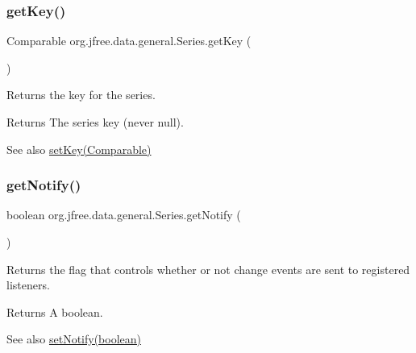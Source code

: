 \subsubsection{\texorpdfstring{get\+Key()}{getKey()}}
{\footnotesize\ttfamily Comparable org.\+jfree.\+data.\+general.\+Series.\+get\+Key (\begin{DoxyParamCaption}{ }\end{DoxyParamCaption})}

Returns the key for the series.

\begin{DoxyReturn}{Returns}
The series key (never {\ttfamily null}).
\end{DoxyReturn}
\begin{DoxySeeAlso}{See also}
\mbox{\hyperlink{classorg_1_1jfree_1_1data_1_1general_1_1_series_a9d5a4915a30d62fc59dbfc351efdf24e}{set\+Key(\+Comparable)}} 
\end{DoxySeeAlso}
\mbox{\label{classorg_1_1jfree_1_1data_1_1general_1_1_series_a9a5482d882214bd5a1be9690b77fbd39}} 
\subsubsection{\texorpdfstring{get\+Notify()}{getNotify()}}
{\footnotesize\ttfamily boolean org.\+jfree.\+data.\+general.\+Series.\+get\+Notify (\begin{DoxyParamCaption}{ }\end{DoxyParamCaption})}

Returns the flag that controls whether or not change events are sent to registered listeners.

\begin{DoxyReturn}{Returns}
A boolean.
\end{DoxyReturn}
\begin{DoxySeeAlso}{See also}
\mbox{\hyperlink{classorg_1_1jfree_1_1data_1_1general_1_1_series_a3d1c8936672fc710b1ae7c56751230b6}{set\+Notify(boolean)}} 
\end{DoxySeeAlso}
\mbox{\label{classorg_1_1jfree_1_1data_1_1general_1_1_series_a2e3ec0d224f21617a941872143d83bd3}} 
